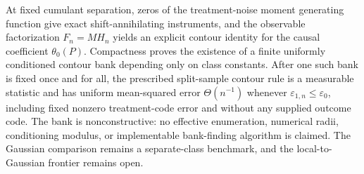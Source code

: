 At fixed cumulant separation, zeros of the treatment-noise moment generating function give exact shift-annihilating instruments, and the observable factorization \(F_n=M H_n\) yields an explicit contour identity for the causal coefficient \(\theta_0(P)\).  Compactness proves the existence of a finite uniformly conditioned contour bank depending only on class constants.  After one such bank is fixed once and for all, the prescribed split-sample contour rule is a measurable statistic and has uniform mean-squared error \(\Theta(n^{-1})\) whenever \(\varepsilon_{1,n}\le\varepsilon_0\), including fixed nonzero treatment-code error and without any supplied outcome code.  The bank is nonconstructive: no effective enumeration, numerical radii, conditioning modulus, or implementable bank-finding algorithm is claimed.  The Gaussian comparison remains a separate-class benchmark, and the local-to-Gaussian frontier remains open.